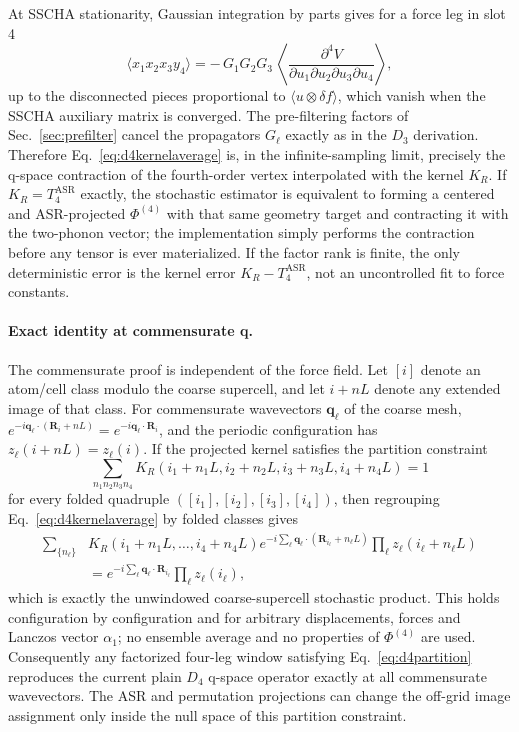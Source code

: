 \documentclass[11pt,a4paper]{article}
\newcommand{\qv}{\mathbf{q}}
\newcommand{\Rv}{\mathbf{R}}
\begin{document}
At SSCHA stationarity, Gaussian integration by parts gives for a force leg
in slot 4
\begin{equation}
\bigl\langle x_1 x_2 x_3 y_4 \bigr\rangle
= -\,G_1G_2G_3\,
\left\langle
\frac{\partial^4 V}{\partial u_1\partial u_2\partial u_3\partial u_4}
\right\rangle ,
\label{eq:d4ibp}
\end{equation}
up to the disconnected pieces proportional to
$\langle u\otimes\delta f\rangle$, which vanish when the SSCHA auxiliary
matrix is converged.  The pre-filtering factors of
Sec.~\ref{sec:prefilter} cancel the propagators $G_\ell$ exactly as in the
$D_3$ derivation.  Therefore Eq.~\eqref{eq:d4kernelaverage} is, in the
infinite-sampling limit, precisely the q-space contraction of the
fourth-order vertex interpolated with the kernel $K_R$.  If
$K_R=T_4^{\mathrm{ASR}}$ exactly, the stochastic estimator is equivalent to
forming a centered and ASR-projected $\Phi^{(4)}$ with that same geometry
target and contracting it with the two-phonon vector; the implementation
simply performs the contraction before any tensor is ever materialized.
If the factor rank is finite, the only deterministic error is the kernel
error $K_R-T_4^{\mathrm{ASR}}$, not an uncontrolled fit to force constants.

\paragraph{Exact identity at commensurate q.}
The commensurate proof is independent of the force field.  Let
$[i]$ denote an atom/cell class modulo the coarse supercell, and let
$i+nL$ denote any extended image of that class.  For commensurate
wavevectors $\qv_\ell$ of the coarse mesh,
$e^{-i\qv_\ell\cdot(\Rv_i+nL)}=e^{-i\qv_\ell\cdot\Rv_i}$, and the
periodic configuration has $z_\ell(i+nL)=z_\ell(i)$.  If the projected
kernel satisfies the partition constraint
\begin{equation}
\sum_{n_1n_2n_3n_4}
K_R(i_1+n_1L,i_2+n_2L,i_3+n_3L,i_4+n_4L)=1
\label{eq:d4partition}
\end{equation}
for every folded quadruple $([i_1],[i_2],[i_3],[i_4])$, then regrouping
Eq.~\eqref{eq:d4kernelaverage} by folded classes gives
\begin{align}
\sum_{\{n_\ell\}}&
K_R(i_1+n_1L,\ldots,i_4+n_4L)
e^{-i\sum_\ell\qv_\ell\cdot(\Rv_{i_\ell}+n_\ell L)}
\prod_\ell z_\ell(i_\ell+n_\ell L)
\nonumber\\
&=
e^{-i\sum_\ell\qv_\ell\cdot\Rv_{i_\ell}}
\prod_\ell z_\ell(i_\ell),
\end{align}
which is exactly the unwindowed coarse-supercell stochastic product.  This
holds configuration by configuration and for arbitrary displacements,
forces and Lanczos vector $\alpha_1$; no ensemble average and no
properties of $\Phi^{(4)}$ are used.  Consequently any factorized
four-leg window satisfying Eq.~\eqref{eq:d4partition} reproduces the
current plain $D_4$ q-space operator exactly at all commensurate
wavevectors.  The ASR and permutation projections can change the off-grid
image assignment only inside the null space of this partition constraint.
\end{document}
